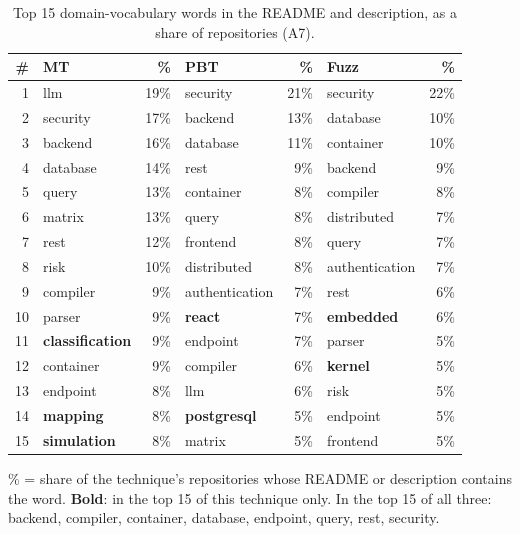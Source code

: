 \documentclass[11pt,a4paper]{article}
\begin{document}
\begin{table}[htbp]
\centering
\small
\caption{Top 15 domain-vocabulary words in the README and description, as a share of repositories (A7).}
\label{tab:cmp-a7}
\begin{tabular}{@{}rlrlrlr@{}}
\toprule
\# & MT & \% & PBT & \% & Fuzz & \% \\
\midrule
1 & llm & 19\% & security & 21\% & security & 22\% \\
2 & security & 17\% & backend & 13\% & database & 10\% \\
3 & backend & 16\% & database & 11\% & container & 10\% \\
4 & database & 14\% & rest & 9\% & backend & 9\% \\
5 & query & 13\% & container & 8\% & compiler & 8\% \\
6 & matrix & 13\% & query & 8\% & distributed & 7\% \\
7 & rest & 12\% & frontend & 8\% & query & 7\% \\
8 & risk & 10\% & distributed & 8\% & authentication & 7\% \\
9 & compiler & 9\% & authentication & 7\% & rest & 6\% \\
10 & parser & 9\% & \textbf{react} & 7\% & \textbf{embedded} & 6\% \\
11 & \textbf{classification} & 9\% & endpoint & 7\% & parser & 5\% \\
12 & container & 9\% & compiler & 6\% & \textbf{kernel} & 5\% \\
13 & endpoint & 8\% & llm & 6\% & risk & 5\% \\
14 & \textbf{mapping} & 8\% & \textbf{postgresql} & 5\% & endpoint & 5\% \\
15 & \textbf{simulation} & 8\% & matrix & 5\% & frontend & 5\% \\
\bottomrule
\end{tabular}
\par\smallskip\parbox{0.94\linewidth}{\footnotesize \% = share of the technique's repositories whose README or description contains the word. \textbf{Bold}: in the top 15 of this technique only. In the top 15 of all three: backend, compiler, container, database, endpoint, query, rest, security.}
\end{table}
\end{document}
